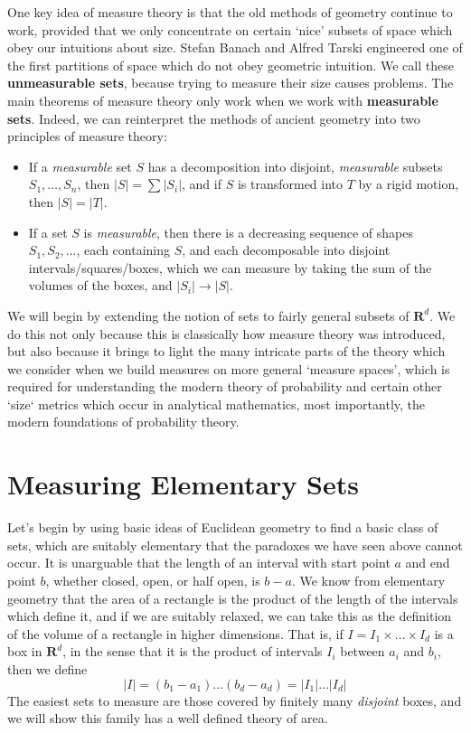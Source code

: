 %
One key idea of measure theory is that the old methods of geometry continue to work, provided that we only concentrate on certain `nice' subsets of space which obey our intuitions about size. Stefan Banach and Alfred Tarski engineered one of the first partitions of space which do not obey geometric intuition. We call these {\bf unmeasurable sets}, because trying to measure their size causes problems. The main theorems of measure theory only work when we work with {\bf measurable sets}. Indeed, we can reinterpret the methods of ancient geometry into two principles of measure theory:
%
\begin{itemize}
    \item If a {\it measurable} set $S$ has a decomposition into disjoint, {\it measurable} subsets $S_1, \dots, S_n$, then $|S| = \sum |S_i|$, and if $S$ is transformed into $T$ by a rigid motion, then $|S| = |T|$.

    \item If a set $S$ is {\it measurable}, then there is a decreasing sequence of shapes $S_1, S_2, \dots$, each containing $S$, and each decomposable into disjoint intervals/squares/boxes, which we can measure by taking the sum of the volumes of the boxes, and $|S_i| \to |S|$.
\end{itemize}
%
We will begin by extending the notion of sets to fairly general subsets of $\mathbf{R}^d$. We do this not only because this is classically how measure theory was introduced, but also because it brings to light the many intricate parts of the theory which we consider when we build measures on more general `measure spaces', which is required for understanding the modern theory of probability and certain other `size` metrics which occur in analytical mathematics, most importantly, the modern foundations of probability theory.

\section{Measuring Elementary Sets}

Let's begin by using basic ideas of Euclidean geometry to find a basic class of sets, which are suitably elementary that the paradoxes we have seen above cannot occur. It is unarguable that the length of an interval with start point $a$ and end point $b$, whether closed, open, or half open, is $b - a$. We know from elementary geometry that the area of a rectangle is the product of the length of the intervals which define it, and if we are suitably relaxed, we can take this as the definition of the volume of a rectangle in higher dimensions. That is, if $I = I_1 \times \dots \times I_d$ is a box in $\mathbf{R}^d$, in the sense that it is the product of intervals $I_i$ between $a_i$ and $b_i$, then we define
%
\[ |I| = (b_1 - a_1) \dots (b_d - a_d) = |I_1| \dots |I_d| \]
%
The easiest sets to measure are those covered by finitely many {\it disjoint} boxes, and we will show this family has a well defined theory of area.


